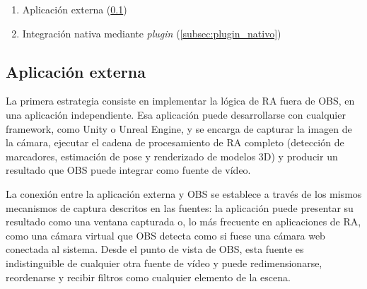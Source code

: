 \begin{enumerate}
\item {Aplicación externa} (\ref{subsec:app_externa})
\item {Integración nativa mediante \textit{plugin}} (\ref{subsec:plugin_nativo})
\end{enumerate}

\subsection{Aplicación externa}\label{subsec:app_externa}

La primera estrategia consiste en implementar la lógica de RA fuera de OBS, en una aplicación independiente. Esa aplicación puede desarrollarse con cualquier framework, como Unity o Unreal Engine, y se encarga de capturar la imagen de la cámara, ejecutar el cadena de procesamiento de RA completo (detección de marcadores, estimación de pose y renderizado de modelos 3D) y producir un resultado que OBS puede integrar como fuente de vídeo.

La conexión entre la aplicación externa y OBS se establece a través de los mismos mecanismos de captura descritos en las fuentes: la aplicación puede presentar su resultado como una ventana capturada o, lo más frecuente en aplicaciones de RA, como una cámara virtual que OBS detecta como si fuese una cámara web conectada al sistema. Desde el punto de vista de OBS, esta fuente es indistinguible de cualquier otra fuente de vídeo y puede redimensionarse, reordenarse y recibir filtros como cualquier elemento de la escena.

